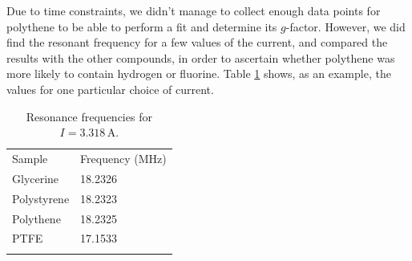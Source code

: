 \documentclass[a4paper]{jpconf}
\numberwithin{equation}{section}
\begin{document}
Due to time constraints, we didn't manage to collect enough data points for polythene to be able to perform a fit and determine its $g$-factor. However, we did find the resonant frequency for a few values of the current, and compared the results with the other compounds, in order to ascertain whether polythene was more likely to contain hydrogen or fluorine. Table \ref{table: polythene} shows, as an example, the values for one particular choice of current.

\begin{table}[htbp]
	\caption{\label{table: polythene} Resonance frequencies for $I = 3.318 \, \si{\ampere}$.}
	\begin{center}
		\begin{tabular}{ll}
			\br
			Sample&Frequency ($\si{\mega\hertz}$)\\
			\mr
			Glycerine&18.2326\\
			Polystyrene&18.2323\\
			Polythene&18.2325\\
			PTFE&17.1533\\
			\br
		\end{tabular}
	\end{center}
\end{table}

\end{document}
